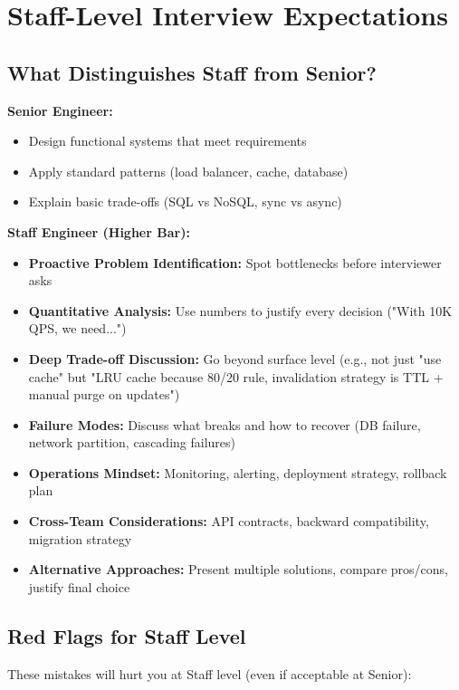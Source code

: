 \documentclass[10pt]{article}
\begin{document}
\section{Staff-Level Interview Expectations}

\subsection{What Distinguishes Staff from Senior?}

\textbf{Senior Engineer:}
\begin{itemize}
\item Design functional systems that meet requirements
\item Apply standard patterns (load balancer, cache, database)
\item Explain basic trade-offs (SQL vs NoSQL, sync vs async)
\end{itemize}

\textbf{Staff Engineer (Higher Bar):}
\begin{itemize}
\item \textbf{Proactive Problem Identification:} Spot bottlenecks before interviewer asks
\item \textbf{Quantitative Analysis:} Use numbers to justify every decision ("With 10K QPS, we need...")
\item \textbf{Deep Trade-off Discussion:} Go beyond surface level (e.g., not just "use cache" but "LRU cache because 80/20 rule, invalidation strategy is TTL + manual purge on updates")
\item \textbf{Failure Modes:} Discuss what breaks and how to recover (DB failure, network partition, cascading failures)
\item \textbf{Operations Mindset:} Monitoring, alerting, deployment strategy, rollback plan
\item \textbf{Cross-Team Considerations:} API contracts, backward compatibility, migration strategy
\item \textbf{Alternative Approaches:} Present multiple solutions, compare pros/cons, justify final choice
\end{itemize}

\subsection{Red Flags for Staff Level}

These mistakes will hurt you at Staff level (even if acceptable at Senior):
\end{document}
